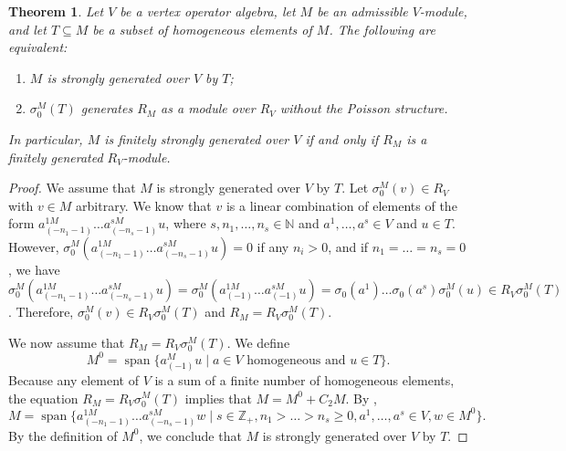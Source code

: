 \documentclass[a4paper, 12pt, reqno]{amsart}
\newtheorem{theorem}{Theorem}[section]
\theoremstyle{remark}
\DeclareMathOperator{\vspan}{span}
\begin{document}
\begin{theorem}
  \label{thr:59}
  Let $V$ be a vertex operator algebra, let $M$ be an admissible $V$-module, and let $T \subseteq M$ be a subset of homogeneous elements of $M$.
  The following are equivalent:
  \begin{enumerate}
  \item $M$ is strongly generated over $V$ by $T$;
  \item $\sigma^M_0(T)$ generates $R_M$ as a module over $R_V$ without the Poisson structure.
  \end{enumerate}
  In particular, $M$ is finitely strongly generated over $V$ if and only if $R_M$ is a finitely generated $R_V$-module.
\end{theorem}

\begin{proof}
  We assume that $M$ is strongly generated over $V$ by $T$.
  Let $\sigma^M_0(v) \in R_V$ with $v \in M$ arbitrary.
  We know that $v$ is a linear combination of elements of the form $a^{1M}_{(-n_1 - 1)}\dots a^{sM}_{(-n_s - 1)}u$, where $s, n_1, \dots, n_s \in \mathbb{N}$ and $a^1, \dots, a^s \in V$ and $u \in T$.
  However, $\sigma^M_0(a^{1M}_{(-n_1 - 1)}\dots a^{sM}_{(-n_s - 1)}u) = 0$ if any $n_i > 0$, and if $n_1 = \dots = n_s = 0$, we have $\sigma^M_0(a^{1M}_{(-n_1 - 1)}\dots a^{sM}_{(-n_s - 1)}u) = \sigma^M_0(a^{1M}_{(-1)}\dots a^{sM}_{(-1)}u) = \sigma_0(a^1)\dots\sigma_0(a^s)\sigma^M_0(u) \in R_V\sigma^M_0(T)$.
  Therefore, $\sigma^M_0(v) \in R_V\sigma^M_0(T)$ and $R_M = R_V\sigma^M_0(T)$.

  We now assume that $R_M = R_V\sigma^M_0(T)$.
  We define
  \begin{equation*}
    M^0 = \vspan\{a^M_{(-1)}u \mid \text{$a \in V$ homogeneous and $u \in T$}\}.
  \end{equation*}
  Because any element of $V$ is a sum of a finite number of homogeneous elements, the equation $R_M = R_V\sigma^M_0(T)$ implies that $M = M^0 + C_2M$.
  By \cite[Proposition 4.12]{li_abelianizing_2005},
  \begin{equation*}
    M = \vspan\{a^{1M}_{(-n_1 - 1)}\dots a^{sM}_{(-n_s - 1)}w \mid s \in \mathbb{Z}_+, n_1 > \dots > n_s \ge 0, a^1, \dots, a^s \in V, w \in M^0\}.
  \end{equation*}
  By the definition of $M^0$, we conclude that $M$ is strongly generated over $V$ by $T$.
\end{proof}
\end{document}
